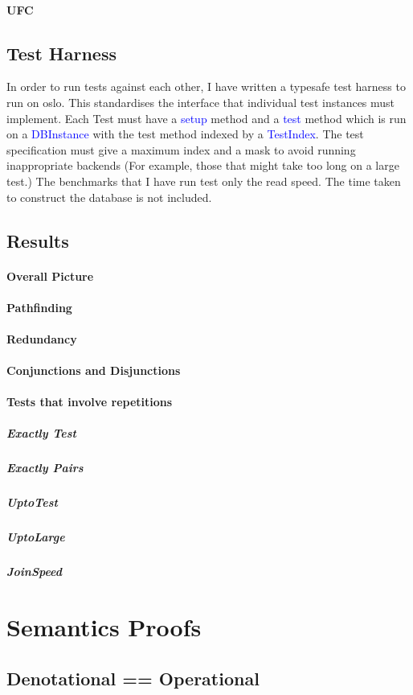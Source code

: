 \documentclass[12pt,a4paper,twoside,openright]{report}
\newcommand\codeName[1]{\textcolor{blue}{#1}}
\begin{document}
		\paragraph{UFC}
	\subsection{Test Harness}
	In order to run tests against each other, I have written a typesafe test harness to run on oslo. This standardises the interface that individual test instances must implement. Each Test must have a \codeName{setup} method and a \codeName{test} method which is run on a \codeName{DBInstance} with the test method indexed by a \codeName{TestIndex}. The test specification must give a maximum index and a mask to avoid running inappropriate backends (For example, those that might take too long on a large test.) The benchmarks that I have run test only the read speed. The time taken to construct the database is not included.
	
	\subsection{Results}
		\paragraph{Overall Picture}
		\paragraph{Pathfinding}
		\paragraph{Redundancy}
		\paragraph{Conjunctions and Disjunctions}
		\paragraph{Tests that involve repetitions}
			\subparagraph{Exactly Test}
			\subparagraph{Exactly Pairs}
			\subparagraph{UptoTest}
			\subparagraph{UptoLarge}
			\subparagraph{JoinSpeed}
\section{Semantics Proofs}
	\subsection{Denotational == Operational}
\end{document}

